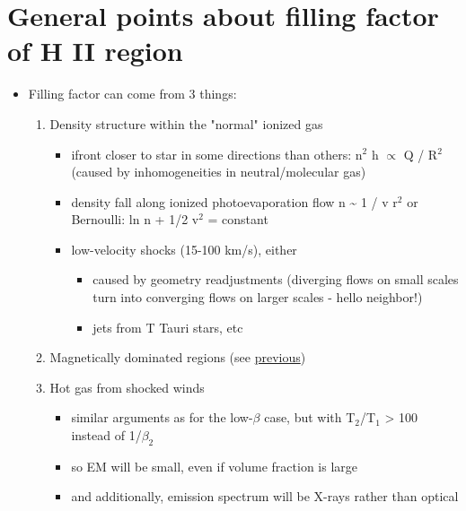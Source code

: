 \documentclass[11pt]{article}
\begin{document}
\section{General points about filling factor of H II region}
\label{sec:orgheadline3}
\begin{itemize}
\item Filling factor can come from 3 things:
\begin{enumerate}
\item Density structure within the "normal" ionized gas
\begin{itemize}
\item ifront closer to star in some directions than others: n\(^{\text{2}}\) h \(\propto\) Q / R\(^{\text{2}}\) (caused by inhomogeneities in neutral/molecular gas)
\item density fall along ionized photoevaporation flow n \textasciitilde{} 1 / v r\(^{\text{2}}\) or Bernoulli: ln n + 1/2 v\(^{\text{2}}\) = constant
\item low-velocity shocks (15-100 km/s), either
\begin{itemize}
\item caused by geometry readjustments (diverging flows on small scales turn into converging flows on larger scales - hello neighbor!)
\item jets from T Tauri stars, etc
\end{itemize}
\end{itemize}
\item Magnetically dominated regions (see \hyperref[sec:orgheadline2]{previous})
\item Hot gas from shocked winds
\begin{itemize}
\item similar arguments as for the low-\(\beta\) case, but with T\(_{\text{2}}\)/T\(_{\text{1}}\) > 100 instead of 1/\(\beta_{\text{2}}\)
\item so EM will be small, even if volume fraction is large
\item and additionally, emission spectrum will be X-rays rather than optical
\end{itemize}
\end{enumerate}
\end{itemize}
\end{document}
